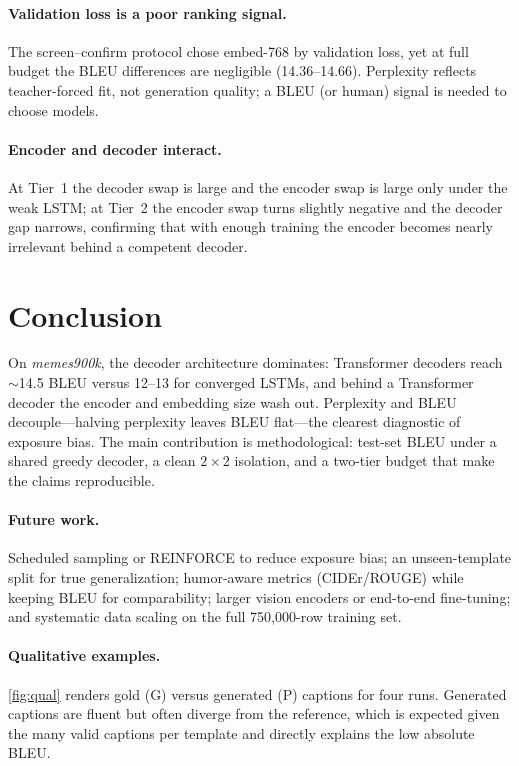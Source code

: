 \documentclass{article}
\theoremstyle{plain}
\theoremstyle{definition}
\theoremstyle{remark}
\begin{document}
\paragraph{Validation loss is a poor ranking signal.} The screen--confirm
protocol chose embed-768 by validation loss, yet at full budget the BLEU
differences are negligible (14.36--14.66). Perplexity reflects teacher-forced
fit, not generation quality; a BLEU (or human) signal is needed to choose
models.

\paragraph{Encoder and decoder interact.} At Tier~1 the decoder swap is large
and the encoder swap is large only under the weak LSTM; at Tier~2 the encoder
swap turns slightly negative and the decoder gap narrows, confirming that with
enough training the encoder becomes nearly irrelevant behind a competent
decoder.

\section{Conclusion}
On \textit{memes900k}, the decoder architecture dominates: Transformer decoders
reach $\sim$14.5 BLEU versus 12--13 for converged LSTMs, and behind a
Transformer decoder the encoder and embedding size wash out. Perplexity and
BLEU decouple---halving perplexity leaves BLEU flat---the clearest diagnostic of
exposure bias. The main contribution is methodological: test-set BLEU under a
shared greedy decoder, a clean $2\times2$ isolation, and a two-tier budget that
make the claims reproducible.

\paragraph{Future work.} Scheduled sampling or REINFORCE to reduce exposure
bias; an unseen-template split for true generalization; humor-aware metrics
(CIDEr/ROUGE) while keeping BLEU for comparability; larger vision encoders or
end-to-end fine-tuning; and systematic data scaling on the full 750{,}000-row
training set.

\paragraph{Qualitative examples.} \cref{fig:qual} renders gold (G) versus
generated (P) captions for four runs. Generated captions are fluent but often
diverge from the reference, which is expected given the many valid captions per
template and directly explains the low absolute BLEU.
\end{document}
